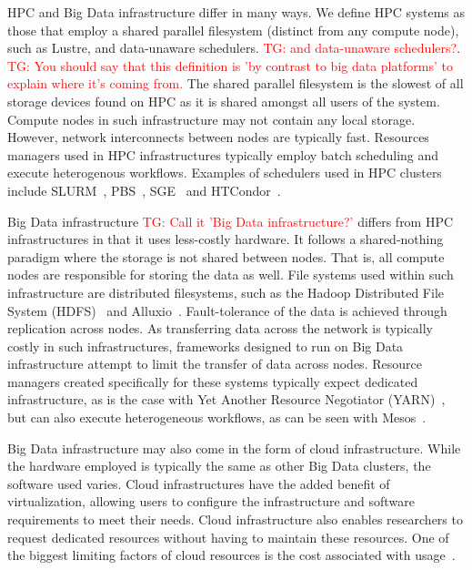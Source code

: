 \documentclass{report}
\newcommand{\tristan}[1]{\textcolor{red}{TG: #1}}
\begin{document}
            HPC and Big Data infrastructure differ in many ways. We define HPC 
            systems as those that employ a shared parallel 
            filesystem (distinct from any compute node), such as Lustre, and 
            data-unaware schedulers. \tristan{and data-unaware schedulers?}.
            \tristan{You should say that this definition is 'by contrast to big data platforms' to explain where it's coming from.}
            The shared parallel filesystem is the slowest of
            all storage devices found on HPC as it is shared amongst all users 
            of the system.
            Compute nodes in such infrastructure may not contain any local 
            storage. However, network interconnects between nodes are typically 
            fast.
            Resources managers used in HPC infrastructures typically employ 
            batch scheduling and execute heterogenous workflows. 
            Examples of schedulers used in HPC clusters 
            include SLURM~\cite{yoo2003slurm}, 
            PBS~\cite{10.1007/3-540-60153-8_34}, SGE~\cite{SGE} and 
            HTCondor~\cite{htcondor}.

            Big Data infrastructure \tristan{Call it 'Big Data infrastructure?'} differs from HPC infrastructures in that
            it uses less-costly hardware. It follows a shared-nothing paradigm
            where the storage is not shared between nodes. That is, all compute
            nodes are responsible for storing the data as well. File systems
            used within such infrastructure are distributed filesystems, such 
            as the
            Hadoop Distributed File System (HDFS)~\cite{5496972} and 
            Alluxio~\cite{Li:2014:TRM:2670979.2670985}.
            Fault-tolerance of the data is achieved through replication across
            nodes. As transferring data across the network is typically costly 
            in such infrastructures, frameworks designed to run on Big Data 
            infrastructure attempt to limit the transfer of data across nodes. 
            Resource managers created specifically for these systems
            typically expect dedicated infrastructure, as is the case with 
            Yet Another Resource Negotiator 
            (YARN)~\cite{Vavilapalli:2013:AHY:2523616.2523633}, but can also 
            execute heterogeneous workflows, as can be seen with 
            Mesos~\cite{hindman2011mesos}.

            Big Data infrastructure may also come in the form of cloud 
            infrastructure.
            While the hardware employed is typically the same as other
            Big Data clusters, the software used varies. Cloud infrastructures
            have the added benefit of virtualization, allowing users to 
            configure the infrastructure and software requirements to meet their
            needs. Cloud infrastructure also enables researchers to request
            dedicated resources without having to maintain these resources. One
            of the biggest limiting factors of cloud resources is the cost 
            associated with usage~\cite{10.3389/fninf.2017.00063}.
\end{document}

